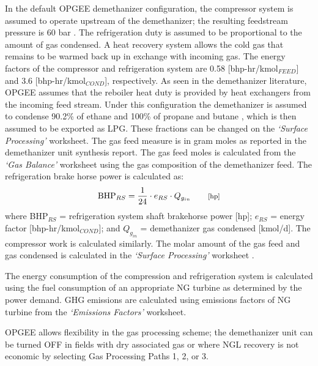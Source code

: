 \documentclass[11pt]{report}
\newcommand{\marg}[1]{{\footnotesize\textit{\textcolor{stanford}{'#1'}}}}
\newcommand{\marginnote}[1]{\marginpar{\marg{#1}}}
\newcommand{\sheet}[1]{\textit{`{#1}'}}
\begin{document}
In the default OPGEE demethanizer configuration, the compressor system is assumed to operate upstream of the demethanizer; the resulting feedstream pressure is 60 bar \cite{Nawaz2010}. The refrigeration duty is assumed to be proportional to the amount of gas condensed. A heat recovery system allows the cold gas that remains to be warmed back up in exchange with incoming gas. The energy factors of the compressor and refrigeration system are 0.58 [bhp-hr/kmol$_{FEED}$] and 3.6 [bhp-hr/kmol$_{COND}$], respectively\marginnote{Surface Processing 1.2.2.3.2}. As seen in the demethanizer literature, OPGEE assumes that the reboiler heat duty is provided by heat exchangers from the incoming feed stream. Under this configuration the demethanizer is assumed to condense 90.2\% of ethane and 100\% of propane and butane \cite{Nawaz2010}, which is then assumed to be exported as LPG. These fractions can be changed on the \sheet{Surface Processing} worksheet\marginnote{Surface \\ Processing 1.2.2.3.1}. The gas feed measure is in gram moles as reported in the demethanizer unit synthesis report. The gas feed moles is calculated from the \sheet{Gas Balance} worksheet using the gas composition of the demethanizer feed. The refrigeration brake horse power is calculated as:
\begin{equation} \label{eq:BHP_refrigeration}
\text{BHP}_{RS} = \frac{1}{24}\cdot e_{RS} \cdot Q_{g_{in}} \quad
\quad \begin{footnotesize}\text{[hp]} \end{footnotesize}
\end{equation}
where BHP$_{RS}$ = refrigeration system shaft brakehorse power [hp]; $e_{RS}$ = energy factor [bhp-hr/kmol$_{COND}$]; and $Q_{g_{in}}$ = demethanizer gas condensed [kmol/d]. The compressor work is calculated similarly. The molar amount of the gas feed and gas condensed is calculated in the \sheet{Surface Processing} worksheet \marginnote{Surface \\ Processing 2.2.3.1}. \par
The energy consumption of the compression and refrigeration system is calculated using the fuel consumption of an appropriate NG turbine as determined by the power demand. GHG emissions are calculated using emissions factors of NG turbine from the \sheet{Emissions Factors} worksheet.\par
OPGEE allows flexibility in the gas processing scheme; the demethanizer unit can be turned OFF in fields with dry associated gas or where NGL recovery is not economic by selecting Gas Processing Paths 1, 2, or 3.
\end{document}
